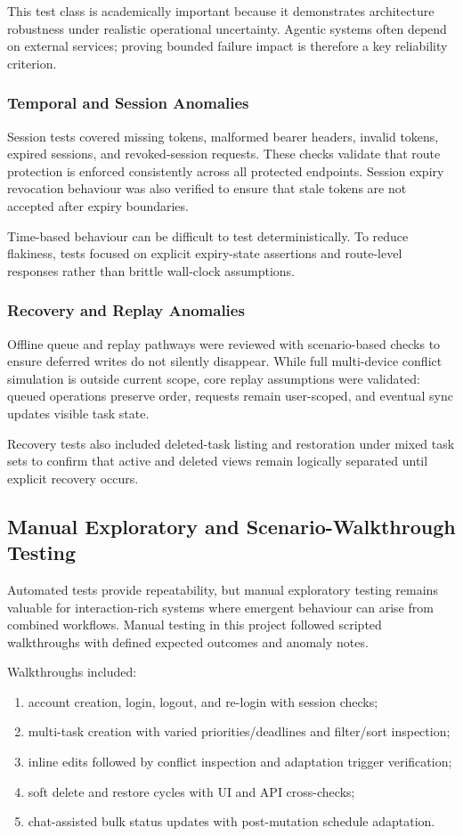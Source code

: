 \documentclass[12pt]{article}
\begin{document}
This test class is academically important because it demonstrates architecture robustness under realistic operational uncertainty. Agentic systems often depend on external services; proving bounded failure impact is therefore a key reliability criterion.

\subsubsection{Temporal and Session Anomalies}
Session tests covered missing tokens, malformed bearer headers, invalid tokens, expired sessions, and revoked-session requests. These checks validate that route protection is enforced consistently across all protected endpoints. Session expiry revocation behaviour was also verified to ensure that stale tokens are not accepted after expiry boundaries.

Time-based behaviour can be difficult to test deterministically. To reduce flakiness, tests focused on explicit expiry-state assertions and route-level responses rather than brittle wall-clock assumptions.

\subsubsection{Recovery and Replay Anomalies}
Offline queue and replay pathways were reviewed with scenario-based checks to ensure deferred writes do not silently disappear. While full multi-device conflict simulation is outside current scope, core replay assumptions were validated: queued operations preserve order, requests remain user-scoped, and eventual sync updates visible task state.

Recovery tests also included deleted-task listing and restoration under mixed task sets to confirm that active and deleted views remain logically separated until explicit recovery occurs.

\subsection{Manual Exploratory and Scenario-Walkthrough Testing}
Automated tests provide repeatability, but manual exploratory testing remains valuable for interaction-rich systems where emergent behaviour can arise from combined workflows. Manual testing in this project followed scripted walkthroughs with defined expected outcomes and anomaly notes.

Walkthroughs included:
\begin{enumerate}
    \item account creation, login, logout, and re-login with session checks;
    \item multi-task creation with varied priorities/deadlines and filter/sort inspection;
    \item inline edits followed by conflict inspection and adaptation trigger verification;
    \item soft delete and restore cycles with UI and API cross-checks;
    \item chat-assisted bulk status updates with post-mutation schedule adaptation.
\end{enumerate}
\end{document}
